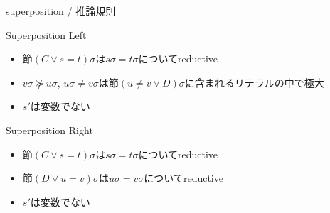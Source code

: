 \documentclass[dvipdfmx,11pt,notheorems]{beamer}
\theoremstyle{definition}
\begin{document}
\begin{frame}{superposition / 推論規則}
  \begin{block}{Superposition Left}
    \begin{prooftree}
    \end{prooftree}
    \vspace{-10pt}

    \begin{itemize}
      \item 節$(C \lor s = t)\sigma$は$s\sigma = t\sigma$についてreductive
      \item $v\sigma \not\succeq u\sigma$, $u\sigma \not= v\sigma$は節$(u \not= v \lor D)\sigma$に含まれるリテラルの中で極大
      \item $s'$は変数でない
    \end{itemize}
  \end{block}

  \begin{block}{Superposition Right}
    \begin{prooftree}
    \end{prooftree}
    \vspace{-10pt}

    \begin{itemize}
      \item 節$(C \lor s = t)\sigma$は$s\sigma = t\sigma$についてreductive
      \item 節$(D \lor u = v)\sigma$は$u\sigma = v\sigma$についてreductive
      \item $s'$は変数でない
    \end{itemize}
  \end{block}
\end{frame}
\end{document}
